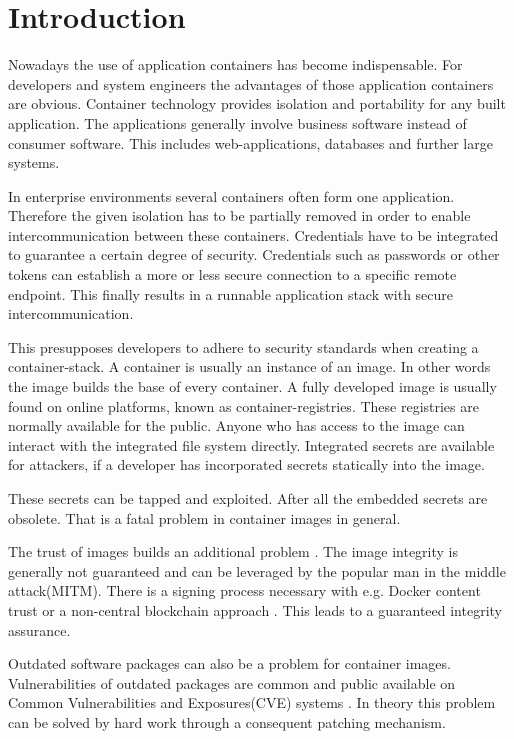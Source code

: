\chapter{Introduction}
\label{ch:intro}

Nowadays the use of application containers has become indispensable. For developers and system engineers the advantages of those application containers are obvious. Container technology provides isolation and portability for any built application. The applications generally involve business software instead of consumer software. This includes web-applications, databases and further large systems. 

In enterprise environments several containers often form one application. Therefore the given isolation has to be partially removed in order to enable intercommunication between these containers. Credentials have to be integrated to guarantee a certain degree of security. Credentials such as passwords or other tokens can establish a more or less secure connection to a specific remote endpoint. This finally results in a runnable application stack with secure intercommunication.

This presupposes developers to adhere to security standards when creating a container-stack. A container is usually an instance of an image. In other words the image builds the base of every container. A fully developed image is usually found on online platforms, known as container-registries. These registries are normally available for the public. Anyone who has access to the image can interact with the integrated file system directly.
Integrated secrets are available for attackers, if a developer has incorporated secrets statically into the image.
 
These secrets can be tapped and exploited. After all the embedded secrets are obsolete. That is a fatal problem in container images in general.

The trust of images builds an additional problem \cite{to_docker_or_not}.
The image integrity is generally not guaranteed and can be leveraged by the popular man in the middle attack(MITM). There is a signing process necessary with e.g. Docker content trust or a non-central blockchain approach \cite{Xu2018}. This leads to a guaranteed integrity assurance.

Outdated software packages can also be a problem for container images. Vulnerabilities of outdated packages are common and public available on Common Vulnerabilities and Exposures(CVE) systems \cite{10.1007/978-3-319-94289-6_8}. In theory this problem can be solved by hard work through a consequent patching mechanism. 


